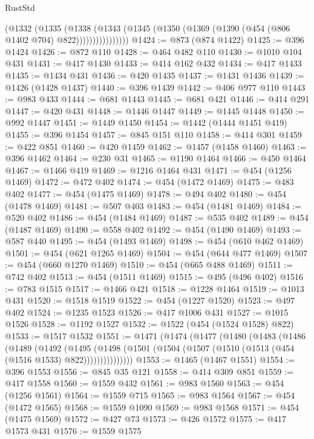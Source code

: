 \begin{lexlean}{RustStd}
\begin{coremodule}
                  (@1332
                    (@1335
                      (@1338
                        (@1343
                          (@1345 (@1350 (@1369 (@1390 (@454 (@806 @1402 @704) @822))))))))))))))))
@1424 := @873 (@874 @1422)
@1425 := @396 @1424
@1426 := @872 @110
@1428 := @464 @482 @110
@1430 := @1010 @104 @431
@1431 := @417 @1430
@1433 := @414 @162 @432
@1434 := @417 @1433
@1435 := @1434 @431
@1436 := @420 @1435
@1437 := @1431 @1436
@1439 := @1426 (@1428 @1437)
@1440 := @396 @1439
@1442 := @406 @977 @110
@1443 := @983 @433
@1444 := @681 @1443
@1445 := @681 @421
@1446 := @414 @291
@1447 := @420 @431
@1448 := @1446 @1447
@1449 := @1445 @1448
@1450 := @992 @1447
@1451 := @1449 @1450
@1454 := @1442 (@1444 @1451 @419)
@1455 := @396 @1454
@1457 := @845 @151 @110
@1458 := @414 @301
@1459 := @422 @851
@1460 := @420 @1459
@1462 := @1457 (@1458 @1460)
@1463 := @396 @1462
@1464 := @230 @31
@1465 := @1190 @1464
@1466 := @450 @1464
@1467 := @1466 @419
@1469 := @1216 @1464 @431
@1471 := @454 (@1256 @1469)
@1472 := @472 @402
@1474 := @454 (@1472 @1469)
@1475 := @483 @402
@1477 := @454 (@1475 @1469)
@1478 := @494 @402
@1480 := @454 (@1478 @1469)
@1481 := @507 @403
@1483 := @454 (@1481 @1469)
@1484 := @520 @402
@1486 := @454 (@1484 @1469)
@1487 := @535 @402
@1489 := @454 (@1487 @1469)
@1490 := @558 @402
@1492 := @454 (@1490 @1469)
@1493 := @587 @440
@1495 := @454 (@1493 @1469)
@1498 := @454 (@610 @462 @1469)
@1501 := @454 (@621 @1265 @1469)
@1504 := @454 (@644 @477 @1469)
@1507 := @454 (@660 @1270 @1469)
@1510 := @454 (@665 @488 @1469)
@1511 := @742 @402
@1513 := @454 (@1511 @1469)
@1515 := @495 (@496 @402)
@1516 := @783 @1515
@1517 := @1466 @421
@1518 := @1228 @1464
@1519 := @1013 @431
@1520 := @1518 @1519
@1522 := @454 (@1227 @1520)
@1523 := @497 @402
@1524 := @1235 @1523
@1526 := @417 @1006 @431
@1527 := @1015 @1526
@1528 := @1192 @1527
@1532 := @1522 (@454 (@1524 @1528) @822)
@1533 := @1517 @1532
@1551 := @1471
    (@1474
      (@1477
        (@1480
          (@1483
            (@1486
              (@1489
                (@1492
                  (@1495
                    (@1498
                      (@1501 (@1504 (@1507 (@1510 (@1513 (@454 (@1516 @1533) @822)))))))))))))))
@1553 := @1465 (@1467 @1551)
@1554 := @396 @1553
@1556 := @845 @35 @121
@1558 := @414 @309 @851
@1559 := @417 @1558
@1560 := @1559 @432
@1561 := @983 @1560
@1563 := @454 (@1256 @1561)
@1564 := @1559 @715
@1565 := @983 @1564
@1567 := @454 (@1472 @1565)
@1568 := @1559 @1090
@1569 := @983 @1568
@1571 := @454 (@1475 @1569)
@1572 := @427 @73
@1573 := @426 @1572
@1575 := @417 @1573 @431
@1576 := @1559 @1575

\end{coremodule}
\end{lexlean}
